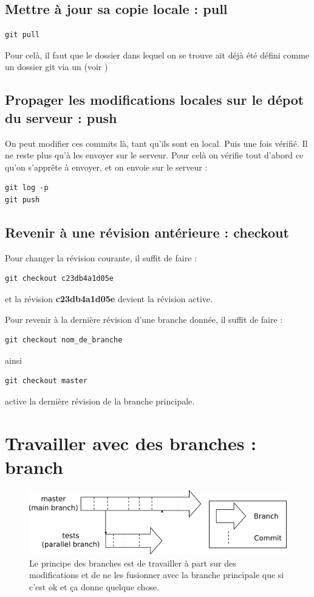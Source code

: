 \documentclass[a4paper,twoside]{article}
\begin{document}
\subsection{Mettre à jour sa copie locale : pull} 
\begin{verbatim}
git pull
\end{verbatim}

Pour celà, il faut que le dossier dans lequel on se trouve ait déjà été défini comme un dossier git via un  (voir )

\subsection{Propager les modifications locales sur le dépot du serveur : push}
On peut modifier ces commits là, tant qu'ils sont en local. Puis une fois vérifié. Il ne reste plus qu'à les envoyer sur le serveur. Pour celà on vérifie tout d'abord ce qu'on s'apprête à envoyer, et on envoie sur le serveur : 
\begin{verbatim}
git log -p
git push
\end{verbatim}

\subsection{Revenir à une révision antérieure : checkout}\label{sec:revenir_en_arriere}
Pour changer la révision courante, il suffit de faire : 
\begin{verbatim}
git checkout c23db4a1d05e
\end{verbatim}
et la révision \textbf{c23db4a1d05e} devient la révision active. 

Pour revenir à la dernière révision d'une branche donnée, il suffit de faire :
\begin{verbatim}
git checkout nom_de_branche
\end{verbatim}
ainsi
\begin{verbatim}
git checkout master
\end{verbatim}
active la dernière révision de la branche principale.


\section{Travailler avec des branches : branch}
\begin{figure}[htb]
\centering
\includegraphics[width=0.75\linewidth]{figure/branchs.pdf}
\caption{Le principe des branches est de travailler à part sur des modifications et de ne les fusionner avec la branche principale que si c'est ok et ça donne quelque chose.}
\end{figure}
\end{document}
